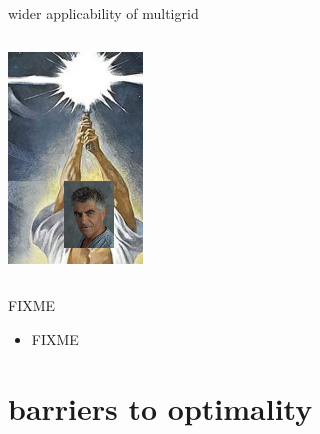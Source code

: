 \documentclass[hide notes,intlimits,usenames,dvipsnames]{beamer}
\begin{document}
\begin{frame}{wider applicability of multigrid}
\begin{columns}
\begin{column}{0.15\textwidth}
\includegraphics[width=\textwidth]{figs/starwars-achi-mashup.jpg}
\end{column}
\end{columns}
\end{frame}

\begin{frame}{FIXME}
\begin{itemize}
\item FIXME
\end{itemize}
\end{frame}



\section{barriers to optimality}
\end{document}
